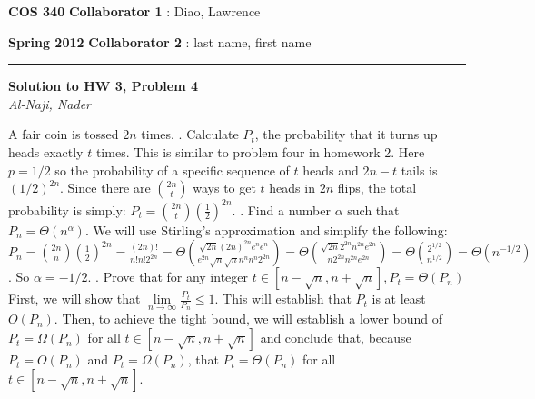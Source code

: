 \documentclass[12pt]{article}
\newcommand{\myheader}[4]
{\vspace*{-0.5in}
\noindent
{#1} \hfill {#3}

\noindent
{#2} \hfill {#4}

\noindent
\rule[8pt]{\textwidth}{1pt}

\vspace{1ex} 
}  %
\newcommand{\myalgsheader}[0]
{\myheader
{ {\bf{COS 340}} }
{ {\bf{Spring 2012}} }
{ {\bf{Collaborator 1}} : Diao, Lawrence }
{ {\bf{Collaborator 2}} : last name, first name}
}
\newcommand{\myhwtitle}[3]
{\begin{center}
{\large {\bf Solution to HW {#1}, Problem {#2}}}\\
\medskip 
{\it {#3}} %
\end{center}}
\begin{document}

\pagebreak

\myalgsheader

\pagestyle{plain}

\myhwtitle{3}{4}{Al-Naji, Nader}

\bigskip

A fair coin is tossed $2n$ times.
\newline
{}. Calculate $P_t$, the probability that it turns up heads exactly $t$ times. 
\newline
\newline
This is similar to problem four in homework 2. Here $p = 1/2$ so the probability of a specific sequence of $t$ heads
and $2n-t$ tails is $(1/2)^{2n}$. Since there are ${2n} \choose t$ ways to get $t$ heads in $2n$ flips, the total 
probability is simply:
\newline
\newline
$P_t = {{2n} \choose t} (\frac{1}{2})^{2n}$.
\newline
{}. Find a number $\alpha$ such that $P_n = \Theta(n^{\alpha})$.
\newline
\newline
We will use Stirling's approximation and simplify the following:
\newline
\newline
$P_n = {{2n} \choose n} (\frac{1}{2})^{2n} = \frac{(2n)!}{n!n!2^{2n}} = \Theta(\frac{\sqrt{2n}(2n)^{2n}e^n e^n}{e^{2n}\sqrt{n}\sqrt{n} n^{n}n^{n} 2^{2n}})
= \Theta (\frac{\sqrt{2n} 2^{2n} n^{2n} e^{2n}}{n 2^{2n} n^{2n} e^{2n}}) = \Theta(\frac{2^{1/2}}{n^{1/2}}) = \Theta(n^{-1/2})$.
\newline
\newline
So $\alpha = -1/2$.
\newline
{}. Prove that for any integer $t \in [n - \sqrt{n}, n + \sqrt{n}], P_t = \Theta (P_n)$
\newline
\newline
First, we will show that $\lim\limits_{n \rightarrow \infty} \frac{P_t}{P_n} \leq 1$. This will establish that 
$P_t$ is at least $O(P_n)$. Then, to achieve the tight bound, we will establish a lower bound of $P_t = \Omega (P_n)$ 
for all  $t \in [n - \sqrt{n}, n + \sqrt{n}]$ and conclude that, because $P_t = O(P_n)$ and $P_t = \Omega(P_n)$, 
that $P_t = \Theta(P_n)$ for all $t \in [n - \sqrt{n}, n + \sqrt{n}]$.
\end{document}
